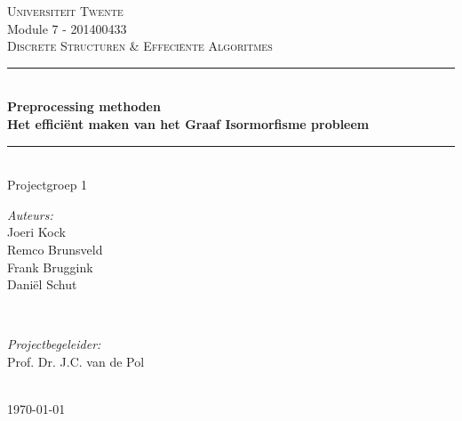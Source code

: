 
\begin{titlepage}
\newcommand{\HRule}{\rule{\linewidth}{0.5mm}}
\center 		%
 

\textsc{\large Universiteit Twente}\\[1.5cm]
Module 7 - 201400433\\
\vspace{5mm}
\textsc{\Large Discrete Structuren \& Effeci\"ente Algoritmes}\\[0.5cm]
\vspace{15mm}


\HRule \\[0.4cm]
{ \huge \bfseries Preprocessing methoden}\\[0.4cm]
{ \large \bfseries Het effici\"ent maken van het Graaf Isormorfisme probleem}\\[0.4cm]
\HRule \\[1.5cm]
 

Projectgroep 1\\
\vspace{10mm}
\begin{minipage}{0.4\textwidth}
\begin{flushleft} \large
\emph{Auteurs:}\\
Joeri Kock\\
Remco Brunsveld\\
Frank Bruggink\\
Dani\"el Schut
\end{flushleft}
\end{minipage}
~
\begin{minipage}{0.4\textwidth}
\begin{flushright} \large
\emph{Projectbegeleider:} \\
Prof. Dr. J.C. van de Pol
\end{flushright}
\end{minipage}\\[4cm]


{\large \today}\\[3cm]

\pagebreak 			%

\end{titlepage}